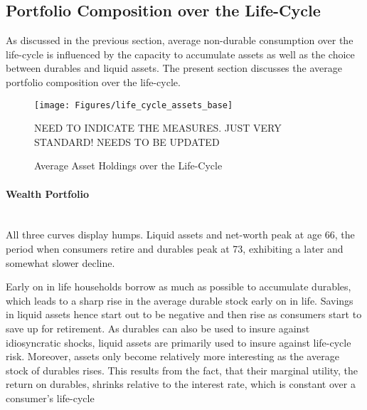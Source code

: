 \documentclass[a4paper,12pt,legno]{article}
\newcommand{\myparagraph}[1]{\paragraph{#1}\mbox{}\\}
\begin{document}
\subsection{Portfolio Composition over the Life-Cycle}
As discussed in the previous section, average non-durable consumption over the life-cycle is influenced by the capacity to accumulate assets as well as the choice between durables and liquid assets. The present section discusses the average portfolio composition over the life-cycle. 

\begin{figure}[!htbp]
\caption{Average Asset Holdings over the Life-Cycle} 
\label{asset_holdings_life_cycle}	%
\centering
\texttt{[image: Figures/life\_cycle\_assets\_base]}  %

\begin{minipage}{0.8\linewidth}
\footnotesize{NEED TO INDICATE THE MEASURES. JUST VERY STANDARD! NEEDS TO BE UPDATED}
\end{minipage}

\end{figure}

\myparagraph{Wealth Portfolio} All three curves display humps. Liquid assets and net-worth peak at age 66, the period when consumers retire and durables peak at 73, exhibiting a later and somewhat slower decline. 

Early on in life households borrow as much as possible to accumulate durables, which leads to a sharp rise in the average durable stock early on in life. Savings in liquid assets hence start out to be negative and then rise as consumers start to save up for retirement. As durables can also be used to insure against idiosyncratic shocks, liquid assets are primarily used to insure against life-cycle risk. Moreover, assets only become relatively more interesting as
the average stock of durables rises. This results from the fact, that their marginal utility, the return on durables, shrinks relative to the interest rate, which is constant over a consumer's life-cycle
\end{document}
